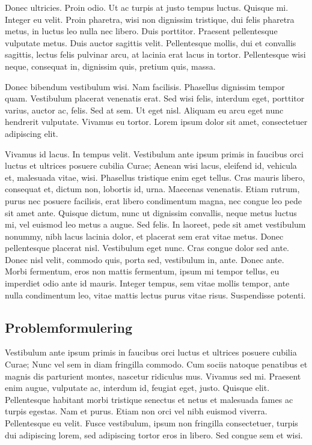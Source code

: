\documentclass[a4paper,11pt]{kth-mag}
\begin{document}
Donec ultricies. Proin odio. Ut ac turpis at justo tempus luctus.
Quisque mi. Integer eu velit. Proin pharetra, wisi non dignissim
tristique, dui felis pharetra metus, in luctus leo nulla nec libero.
Duis porttitor. Praesent pellentesque vulputate metus. Duis auctor
sagittis velit. Pellentesque mollis, dui et convallis sagittis, lectus
felis pulvinar arcu, at lacinia erat lacus in tortor. Pellentesque
wisi neque, consequat in, dignissim quis, pretium quis, massa.

Donec bibendum vestibulum wisi. Nam facilisis. Phasellus dignissim
tempor quam. Vestibulum placerat venenatis erat. Sed wisi felis,
interdum eget, porttitor varius, auctor ac, felis. Sed at sem. Ut eget
nisl. Aliquam eu arcu eget nunc hendrerit vulputate. Vivamus eu
tortor. Lorem ipsum dolor sit amet, consectetuer adipiscing elit.

Vivamus id lacus. In tempus velit. Vestibulum ante ipsum primis in
faucibus orci luctus et ultrices posuere cubilia Curae; Aenean wisi
lacus, eleifend id, vehicula et, malesuada vitae, wisi. Phasellus
tristique enim eget tellus. Cras mauris libero, consequat et, dictum
non, lobortis id, urna. Maecenas venenatis. Etiam rutrum, purus nec
posuere facilisis, erat libero condimentum magna, nec congue leo pede
sit amet ante. Quisque dictum, nunc ut dignissim convallis, neque
metus luctus mi, vel euismod leo metus a augue. Sed felis. In laoreet,
pede sit amet vestibulum nonummy, nibh lacus lacinia dolor, et
placerat sem erat vitae metus. Donec pellentesque placerat nisl.
Vestibulum eget nunc. Cras congue dolor sed ante. Donec nisl velit,
commodo quis, porta sed, vestibulum in, ante. Donec ante. Morbi
fermentum, eros non mattis fermentum, ipsum mi tempor tellus, eu
imperdiet odio ante id mauris. Integer tempus, sem vitae mollis
tempor, ante nulla condimentum leo, vitae mattis lectus purus vitae
risus. Suspendisse potenti.

\subsection{Problemformulering}

Vestibulum ante ipsum primis in faucibus orci luctus et ultrices
posuere cubilia Curae; Nunc vel sem in diam fringilla commodo. Cum
sociis natoque penatibus et magnis dis parturient montes, nascetur
ridiculus mus. Vivamus sed mi. Praesent enim augue, vulputate ac,
interdum id, feugiat eget, justo. Quisque elit. Pellentesque habitant
morbi tristique senectus et netus et malesuada fames ac turpis
egestas. Nam et purus. Etiam non orci vel nibh euismod viverra.
Pellentesque eu velit. Fusce vestibulum, ipsum non fringilla
consectetuer, turpis dui adipiscing lorem, sed adipiscing tortor eros
in libero. Sed congue sem et wisi.
\end{document}

